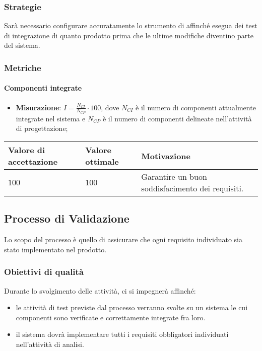 \subsubsection{Strategie}
Sarà necessario configurare accuratamente lo strumento di   affinché esegua dei test di integrazione di quanto prodotto prima che le ultime modifiche diventino parte del sistema.

\subsubsection{Metriche}
\paragraph{Componenti integrate}

\begin{itemize}
\item \textbf{Misurazione}: $I=\frac{N_{CI}}{N_{CP}} \cdot 100$, dove $N_{CI}$ è il numero di componenti attualmente integrate nel sistema e $N_{CP}$ è il numero di componenti delineate nell'attività di progettazione;
\end{itemize}

\begin{center}
		\begin{tabular}{|P{2.5cm}|P{2.5cm}|P{6cm}|}
		\hline
			\textbf{Valore di accettazione}	& \textbf{Valore ottimale} & \textbf{Motivazione} \\
			\hline
			$100$ & $100$ &	Garantire un buon soddisfacimento dei requisiti. \\
			\hline
			\end{tabular}
\end{center}

\subsection{Processo di Validazione}
Lo scopo del processo è quello di assicurare che ogni requisito individuato sia stato implementato nel prodotto.

\subsubsection{Obiettivi di qualità}
Durante lo svolgimento delle attività, ci si impegnerà affinché:
\begin{itemize}
\item le attività di test previste dal processo verranno svolte su un sistema le cui componenti sono verificate e correttamente integrate fra loro.
\item il sistema dovrà implementare tutti i requisiti obbligatori individuati nell'attività di analisi.
\end{itemize}

